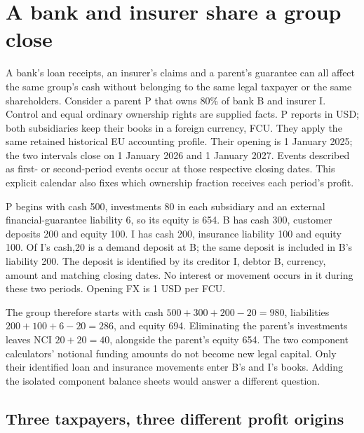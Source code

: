 \section{A bank and insurer share a group close}
\label{sec:sector-company-composition}

A bank's loan receipts, an insurer's claims and a parent's guarantee can all
affect the same group's cash without belonging to the same legal taxpayer or
the same shareholders. Consider a parent P that owns 80\% of bank B and
insurer I. Control and equal ordinary ownership rights are supplied facts.
P reports in USD; both subsidiaries keep their books in a foreign currency,
FCU. They apply the same retained historical EU accounting profile. Their
opening is 1 January 2025; the two intervals close on 1 January 2026 and
1 January 2027. Events described as first- or second-period events occur at
those respective closing dates. This explicit calendar also fixes which
ownership fraction receives each period's profit.

P begins with cash 500, investments 80 in each subsidiary and an external
financial-guarantee liability 6, so its equity is 654. B has cash 300,
customer deposits 200 and equity 100. I has cash 200, insurance liability 100
and equity 100. Of I's cash,20 is a demand deposit at B; the same deposit is
included in B's liability 200. The deposit is identified by its creditor I,
debtor B, currency, amount and matching closing dates. No interest or movement
occurs in it during these two periods. Opening FX is 1 USD per FCU.

The group therefore starts with cash \(500+300+200-20=980\), liabilities
\(200+100+6-20=286\), and equity 694. Eliminating the parent's investments
leaves NCI \(20+20=40\), alongside the parent's equity 654. The two component
calculators' notional funding amounts do not become new legal capital. Only
their identified loan and insurance movements enter B's and I's books.
Adding the isolated component balance sheets would answer a different question.

\subsection{Three taxpayers, three different profit origins}

